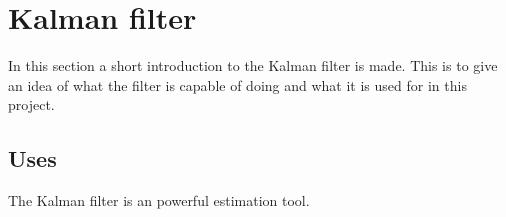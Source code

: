 \section{Kalman filter}

In this section a short introduction to the Kalman filter is made. This is to give an idea of what the filter is capable of doing and what it is used for in this project. 

\subsection*{Uses}
The Kalman filter is an powerful estimation tool. 